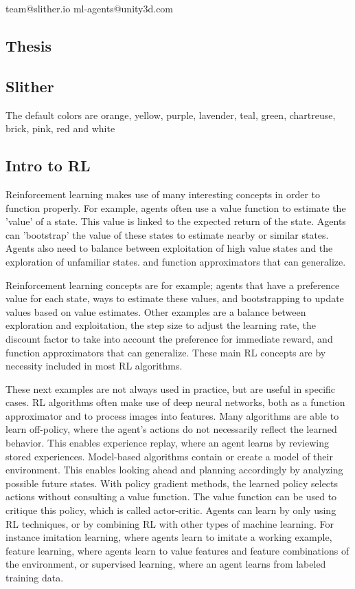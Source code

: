 team@slither.io
 ml-agents@unity3d.com



\subsection{Thesis}

\subsection{Slither}
The default colors are orange, yellow, purple, lavender, teal, green, chartreuse, brick, pink, red and white \cite{web:Slitherio_Wikipedia}


\subsection{Intro to RL}
Reinforcement learning makes use of many interesting concepts in order to function properly. For example, agents often use a value function to estimate the 'value' of a state. This value is linked to the expected return of the state. Agents can 'bootstrap' the value of these states to estimate nearby or similar states. Agents also need to balance between exploitation of high value states and the exploration of unfamiliar states.  and function approximators that can generalize.

Reinforcement learning concepts are for example; agents that have a preference value for each state, ways to estimate these values, and bootstrapping to update values based on value estimates.  Other examples are a balance between exploration and exploitation, the step size to adjust the learning rate, the discount factor to take into account the preference for immediate reward, and function approximators that can generalize. These main RL concepts are by necessity included in most RL algorithms.

These next examples are not always used in practice, but are useful in specific cases. RL algorithms often make use of deep neural networks, both as a function approximator and to process images into features. Many algorithms are able to learn off-policy, where the agent's actions do not necessarily reflect the learned behavior. This enables experience replay, where an agent learns by reviewing stored experiences. Model-based algorithms contain or create a model of their environment. This enables looking ahead and planning accordingly by analyzing possible future states. With policy gradient methods, the learned policy selects actions without consulting a value function. The value function can be used to critique this policy, which is called actor-critic.  Agents can learn by only using RL techniques, or by combining RL with other types of machine learning. For instance imitation learning, where agents learn to imitate a working example, feature learning, where agents learn to value features and feature combinations of the environment, or supervised learning, where an agent learns from labeled training data. 

